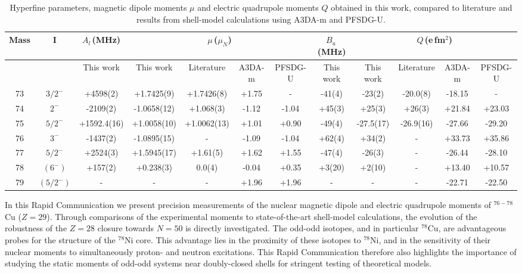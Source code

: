 \documentclass[reprint,superscriptaddress,amsmath,amssymb,aps,prl]{revtex4-1}
\begin{document}
\begin{table*}
\centering
\caption{Hyperfine parameters, magnetic dipole moments $\mu$ and electric quadrupole moments $Q$ obtained in this work, compared to literature \cite{Flanagan2009,Vingerhoets2010,Koster2011} and results from shell-model calculations using A3DA-m and PFSDG-U.}\label{tab:results}
\begin{tabular}{c|c|c|cccc|c|cccc}
    \toprule
    Mass & I & $A_l$\,(MHz) & \multicolumn{4}{c|}{$\mu$\,($\mu_N$)} & $B_u$\,(MHz)  & \multicolumn{4}{c}{$Q$\,(e\,fm$^2$)} \\
    \hline
    & & This work & This work &  Literature & A3DA-m & PFSDG-U & This work & This work &  Literature & A3DA-m & PFSDG-U \\
    \hline
    73 & $3/2^-$   & +4598(2)   & +1.7425(9)   &  +1.7426(8) &  +1.75 & -     &  -41(4)    & -23(2)  &  -20.0(8) & -18.15 & -      \\
    74 & $2^-$     & -2109(2)   & -1.0658(12)  &   +1.068(3) &  -1.12 & -1.04 &  +45(3)    & +25(3)  &  +26(3)   & +21.84 & +23.03 \\
    75 & $5/2^-$   &+1592.4(16) & +1.0058(10)  & +1.0062(13) &  +1.01 & +0.90 & -49(4)     &-27.5(17)& -26.9(16) & -27.66 & -29.20 \\
    76 & $3^-$     & -1437(2)   & -1.0895(15)  & -           &  -1.09 & -1.04 &  +62(4)    & +34(2)  &       -   & +33.73 & +35.86 \\
    77 & $5/2^-$   & +2524(3)   & +1.5945(17)  &   +1.61(5)  &  +1.62 & +1.55 & -47(4)     & -26(3)  &     -     & -26.44 & -28.10 \\
    78 & $ (6^-)$  &  +157(2)   & +0.238(3)    & 0.0(4)      &  -0.04 & +0.35 & +3(20)     & +2(10)  & -         & +13.40 & +10.57 \\
    79 & $(5/2^-)$ &  -         &    -         &    -        &  +1.96 & +1.96 & -          & -       &   -       & -22.71 & -22.50 \\
    \hline
\end{tabular}
\end{table*}

In this Rapid Communication we present precision measurements of the nuclear magnetic dipole and electric quadrupole moments of $^{76-78}$Cu ($Z=29$). Through comparisons of the experimental moments to state-of-the-art shell-model calculations, the evolution of the robustness of the $Z=28$ closure towards $N=50$ is directly investigated. The odd-odd isotopes, and in particular $^{78}$Cu, are advantageous probes for the structure of the $^{78}$Ni core. This advantage lies in the proximity of these isotopes to $^{78}$Ni, and in the sensitivity of their nuclear moments to simultaneously proton- and neutron excitations. This Rapid Communication therefore also highlights the importance of studying the static moments of odd-odd systems near doubly-closed shells for stringent testing of theoretical models.
\end{document}
